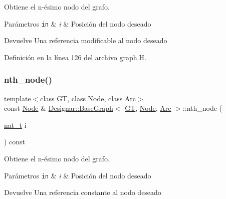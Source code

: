 Obtiene el n-\/ésimo nodo del grafo. 


\begin{DoxyParams}[1]{Parámetros}
\mbox{\tt in}  & {\em i} & Posición del nodo deseado \\
\hline
\end{DoxyParams}
\begin{DoxyReturn}{Devuelve}
Una referencia modificable al nodo deseado 
\end{DoxyReturn}


Definición en la línea 126 del archivo graph.\+H.

\mbox{\label{class_designar_1_1_base_graph_adc03e916cb6246c9eeba181df82fd149}} 
\subsubsection{\texorpdfstring{nth\+\_\+node()}{nth\_node()}\hspace{0.1cm}{\footnotesize\ttfamily [2/2]}}
{\footnotesize\ttfamily template$<$class GT, class Node, class Arc$>$ \\
const \hyperlink{namespace_designar_a5af326c65aa2bd26b26c410f2030d09e}{Node} \& \hyperlink{class_designar_1_1_base_graph}{Designar\+::\+Base\+Graph}$<$ \hyperlink{demo-buildgraph_8_c_a3001c40d2c31ca87ed96cd7d1334a55e}{GT}, \hyperlink{namespace_designar_a5af326c65aa2bd26b26c410f2030d09e}{Node}, \hyperlink{namespace_designar_a3f55fb5513d62ff47cbc8f72b8e95d6f}{Arc} $>$\+::nth\+\_\+node (\begin{DoxyParamCaption}\item[{\hyperlink{namespace_designar_aa72662848b9f4815e7bf31a7cf3e33d1}{nat\+\_\+t}}]{i }\end{DoxyParamCaption}) const\hspace{0.3cm}{\ttfamily [inline]}}



Obtiene el n-\/ésimo nodo del grafo. 


\begin{DoxyParams}[1]{Parámetros}
\mbox{\tt in}  & {\em i} & Posición del nodo deseado \\
\hline
\end{DoxyParams}
\begin{DoxyReturn}{Devuelve}
Una referencia constante al nodo deseado 
\end{DoxyReturn}


